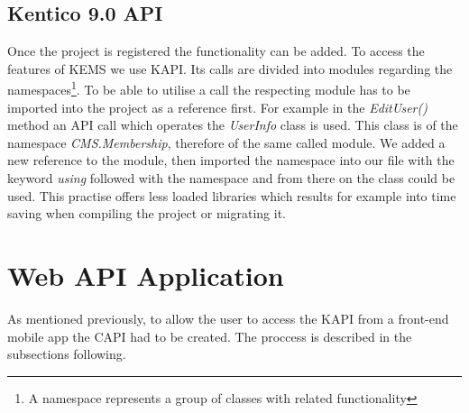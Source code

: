 \subsection{Kentico 9.0 API}
Once the project is registered the functionality can be added. To access the features of KEMS we use KAPI. Its calls are divided into modules regarding the namespaces\footnote{A namespace represents a group of classes with related functionality}. To be able to utilise a call the respecting module has to be imported into the project as a reference first. For example in the \textit{EditUser()} method an API call which operates the \textit{UserInfo} class is used. This class is of the namespace \textit{CMS.Membership}, therefore of the same called module. We added a new reference to the module, then imported the namespace into our file with the keyword \textit{using} followed with the namespace and from there on the class could be used. This practise offers less loaded libraries which results for example into time saving when compiling the project or migrating it. 

\section{Web API Application}
As mentioned previously, to allow the user to access the KAPI from a front-end mobile app the CAPI had to be created. The proccess is described in the subsections following.
